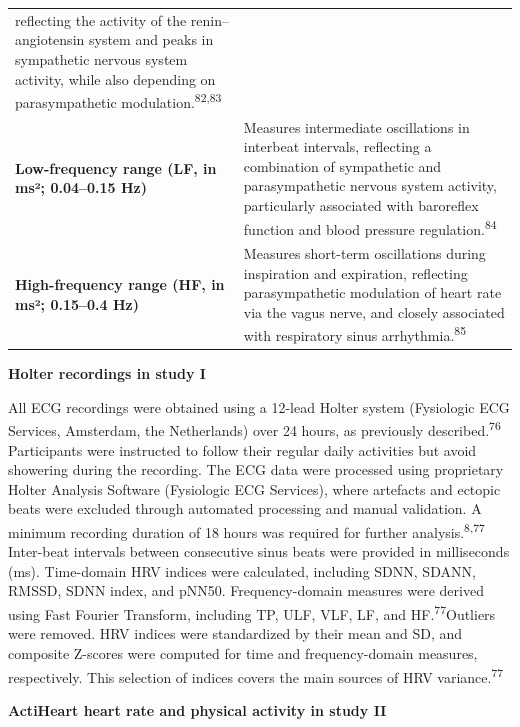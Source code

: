 \documentclass[
  a4paper,
  headsepline=true,
  open=left]{scrbook}
\begin{document}
\begin{longtable}[]{@{}
  >{\raggedright\arraybackslash}p{}
  >{\raggedright\arraybackslash}p{}@{}}
reflecting the activity of the renin--angiotensin system and peaks in
sympathetic nervous system activity, while also depending on
parasympathetic modulation.\textsuperscript{82,83} \\
\textbf{Low-frequency range (LF, in ms²; 0.04--0.15 Hz)} & Measures
intermediate oscillations in interbeat intervals, reflecting a
combination of sympathetic and parasympathetic nervous system activity,
particularly associated with baroreflex function and blood pressure
regulation.\textsuperscript{84} \\
\textbf{High-frequency range (HF, in ms²; 0.15--0.4 Hz)} & Measures
short-term oscillations during inspiration and expiration, reflecting
parasympathetic modulation of heart rate via the vagus nerve, and
closely associated with respiratory sinus
arrhythmia.\textsuperscript{85} \\
\end{longtable}

\textbf{Holter recordings in study I}

All ECG recordings were obtained using a 12-lead Holter system
(Fysiologic ECG Services, Amsterdam, the Netherlands) over 24 hours, as
previously described.\textsuperscript{76} Participants were instructed
to follow their regular daily activities but avoid showering during the
recording. The ECG data were processed using proprietary Holter Analysis
Software (Fysiologic ECG Services), where artefacts and ectopic beats
were excluded through automated processing and manual validation. A
minimum recording duration of 18 hours was required for further
analysis.\textsuperscript{8,77} Inter-beat intervals between consecutive
sinus beats were provided in milliseconds (ms). Time-domain HRV indices
were calculated, including SDNN, SDANN, RMSSD, SDNN index, and pNN50.
Frequency-domain measures were derived using Fast Fourier Transform,
including TP, ULF, VLF, LF, and HF.\textsuperscript{77}Outliers were
removed. HRV indices were standardized by their mean and SD, and
composite Z-scores were computed for time and frequency-domain measures,
respectively. This selection of indices covers the main sources of HRV
variance.\textsuperscript{77}

\textbf{ActiHeart heart rate and physical activity in study II}
\end{document}
